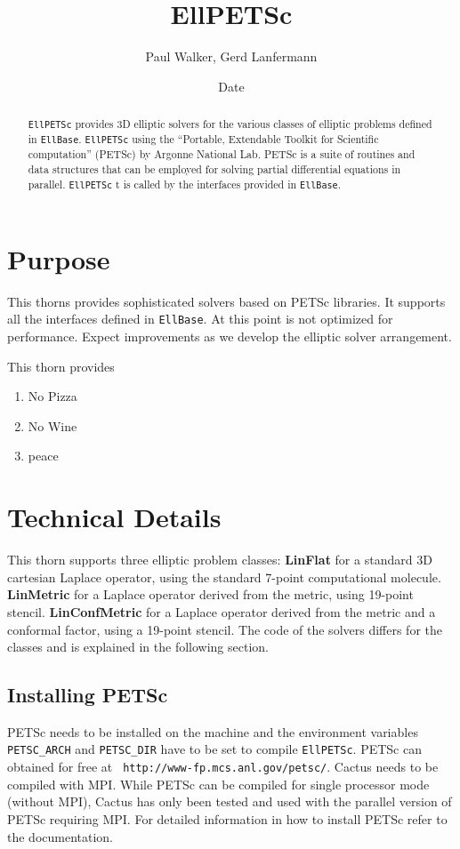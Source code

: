 \documentclass{article}
\begin{document}
\title{EllPETSc}
\author{Paul Walker, Gerd Lanfermann}
\date{$ $Date$ $}

\maketitle


\begin{abstract}
{\tt EllPETSc} provides 3D elliptic solvers for the various
classes of elliptic problems defined in {\tt EllBase}. {\tt EllPETSc}
using the ``Portable, Extendable Toolkit for Scientific computation'' (PETSc)
by Argonne National Lab. PETSc is a suite of routines and data
structures that can be employed for solving partial differential
equations in parallel. {\tt EllPETSc} t is called by the
interfaces provided in {\tt EllBase}.
\end{abstract}

\section{Purpose}
This thorns provides sophisticated solvers based on PETSc
libraries. It supports all the interfaces defined in {\tt EllBase}.
At this point is not optimized for performance. Expect improvements as 
we develop the elliptic solver arrangement.

This thorn provides
 \begin{enumerate}
  \item No Pizza
  \item No Wine
  \item peace
 \end{enumerate}

\section{Technical Details}
This thorn supports three elliptic problem classes: {\bf LinFlat} for 
a standard 3D cartesian Laplace operator, using the standard 7-point
computational molecule. {\bf LinMetric} for a Laplace operator derived
from the metric, using 19-point stencil. {\bf LinConfMetric} for a
Laplace operator derived from the metric and a conformal factor, using 
a 19-point stencil. The code of the solvers differs for the classes
and is explained in the following section. 

\subsection{Installing PETSc}
PETSc needs to be installed on the machine and the environment
variables {\tt PETSC\_ARCH} and {\tt PETSC\_DIR} have to be set to compile
{\tt EllPETSc}. PETSc can obtained for free at {\tt
http://www-fp.mcs.anl.gov/petsc/}. Cactus needs to be compiled with 
MPI. While PETSc can  be compiled for single processor mode (without
MPI), Cactus has only been tested and used with the parallel version
of PETSc requiring MPI. For detailed information in how to install
PETSc refer to the documentation.
\end{document}
